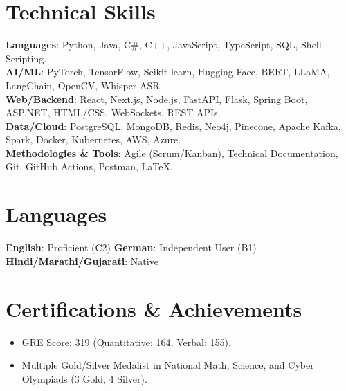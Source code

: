 \documentclass[a4paper,10pt]{article}
\newcommand{\resumeItem}[1]{
  \item\small{#1}
}
\begin{document}
\section{Technical Skills}
\begin{itemize}[leftmargin=0.15in, label={}]
    \small{\item{
     \textbf{Languages}{: Python, Java, C\#, C++, JavaScript, TypeScript, SQL, Shell Scripting.} \\
     \textbf{AI/ML}{: PyTorch, TensorFlow, Scikit-learn, Hugging Face, BERT, LLaMA, LangChain, OpenCV, Whisper ASR.} \\
     \textbf{Web/Backend}{: React, Next.js, Node.js, FastAPI, Flask, Spring Boot, ASP.NET, HTML/CSS, WebSockets, REST APIs.} \\
     \textbf{Data/Cloud}{: PostgreSQL, MongoDB, Redis, Neo4j, Pinecone, Apache Kafka, Spark, Docker, Kubernetes, AWS, Azure.} \\
     \textbf{Methodologies \& Tools}{: Agile (Scrum/Kanban), Technical Documentation, Git, GitHub Actions, Postman, LaTeX.}
    }}
\end{itemize}

\section{Languages}
\begin{itemize}[leftmargin=0.15in, label={}]
    \small{\item{
     \textbf{English}{: Proficient (C2)} \quad \textbf{German}{: Independent User (B1)} \quad \textbf{Hindi/Marathi/Gujarati}{: Native}
    }}
\end{itemize}

\section{Certifications \& Achievements}
\begin{itemize}[leftmargin=0.15in, label={}]
    \resumeItem{GRE Score: 319 (Quantitative: 164, Verbal: 155).}
    \resumeItem{Multiple Gold/Silver Medalist in National Math, Science, and Cyber Olympiads (3 Gold, 4 Silver).}
\end{itemize}
\end{document}
